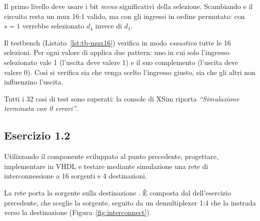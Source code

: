 \begin{attenzione}
	Il primo livello deve usare i bit \emph{meno} significativi della selezione. Scambiando
	 e  il circuito resta un mux 16:1 valido, ma con
	gli ingressi in ordine permutato: con $s=1$ verrebbe selezionato $d_4$ invece di $d_1$.
\end{attenzione}

\simulazione

Il testbench (Listato~\ref{lst:tb-mux16}) verifica in modo \emph{esaustivo} tutte le 16
selezioni. Per ogni valore di  applica due pattern: uno in cui solo l'ingresso
selezionato vale 1 (l'uscita deve valere 1) e il suo complemento (l'uscita deve valere 0).
Così si verifica sia che venga scelto l'ingresso giusto, sia che gli altri non influenzino l'uscita.



\begin{risultato}
	Tutti i 32 casi di test sono superati: la console di XSim riporta
	\emph{``Simulazione terminata con 0 errori''}.
\end{risultato}

\subsection{Esercizio 1.2}

\begin{traccia}
	Utilizzando il componente sviluppato al punto precedente, progettare, implementare in
	VHDL e testare mediante simulazione una rete di interconnessione a 16 sorgenti e 4 destinazioni.
\end{traccia}

\progetto

La rete porta la sorgente  sulla destinazione . È composta dal
 dell'esercizio precedente, che sceglie la sorgente, seguito da un demultiplexer
1:4 che la instrada verso la destinazione (Figura~\ref{fig:interconnect}).

